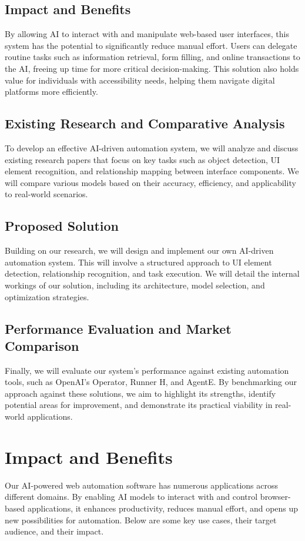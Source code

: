 \documentclass[conference]{IEEEtran}
\begin{document}
\subsection{Impact and Benefits}
By allowing AI to interact with and manipulate web-based user interfaces, this system has the potential to significantly reduce manual effort. Users can delegate routine tasks such as information retrieval, form filling, and online transactions to the AI, freeing up time for more critical decision-making. This solution also holds value for individuals with accessibility needs, helping them navigate digital platforms more efficiently.

\subsection{Existing Research and Comparative Analysis}
To develop an effective AI-driven automation system, we will analyze and discuss existing research papers that focus on key tasks such as object detection, UI element recognition, and relationship mapping between interface components. We will compare various models based on their accuracy, efficiency, and applicability to real-world scenarios.

\subsection{Proposed Solution}
Building on our research, we will design and implement our own AI-driven automation system. This will involve a structured approach to UI element detection, relationship recognition, and task execution. We will detail the internal workings of our solution, including its architecture, model selection, and optimization strategies.

\subsection{Performance Evaluation and Market Comparison}
Finally, we will evaluate our system's performance against existing automation tools, such as OpenAI's Operator, Runner H, and AgentE. By benchmarking our approach against these solutions, we aim to highlight its strengths, identify potential areas for improvement, and demonstrate its practical viability in real-world applications.

\section{Impact and Benefits}
Our AI-powered web automation software has numerous applications across different domains. By enabling AI models to interact with and control browser-based applications, it enhances productivity, reduces manual effort, and opens up new possibilities for automation. Below are some key use cases, their target audience, and their impact.
\end{document}
